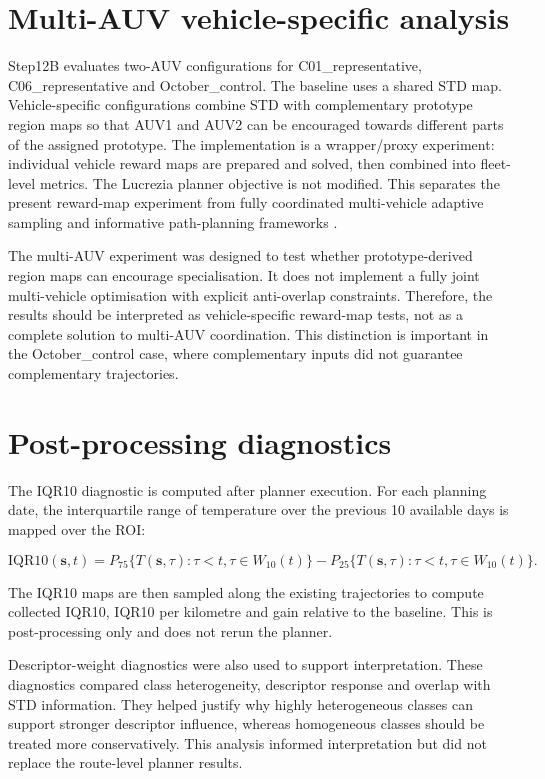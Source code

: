 \section{Multi-AUV vehicle-specific analysis}

Step12B evaluates two-AUV configurations for C01\_representative, C06\_representative and October\_control. The baseline uses a shared STD map. Vehicle-specific configurations combine STD with complementary prototype region maps so that AUV1 and AUV2 can be encouraged towards different parts of the assigned prototype. The implementation is a wrapper/proxy experiment: individual vehicle reward maps are prepared and solved, then combined into fleet-level metrics. The Lucrezia planner objective is not modified. This separates the present reward-map experiment from fully coordinated multi-vehicle adaptive sampling and informative path-planning frameworks \parencite{fiorelli2006multiauv,leonard2010gliderfleet,cao2013multirobotipp}.

The multi-AUV experiment was designed to test whether prototype-derived region maps can encourage specialisation. It does not implement a fully joint multi-vehicle optimisation with explicit anti-overlap constraints. Therefore, the results should be interpreted as vehicle-specific reward-map tests, not as a complete solution to multi-AUV coordination. This distinction is important in the October\_control case, where complementary inputs did not guarantee complementary trajectories.

\section{Post-processing diagnostics}

The IQR10 diagnostic is computed after planner execution. For each planning date, the interquartile range of temperature over the previous 10 available days is mapped over the ROI:

\begin{equation}
\mathrm{IQR10}(\mathbf{s},t)
=
P_{75}\{T(\mathbf{s},\tau):\tau<t,\tau\in W_{10}(t)\}
-
P_{25}\{T(\mathbf{s},\tau):\tau<t,\tau\in W_{10}(t)\}.
\label{eq:iqr10_definition}
\end{equation}

The IQR10 maps are then sampled along the existing trajectories to compute collected IQR10, IQR10 per kilometre and gain relative to the baseline. This is post-processing only and does not rerun the planner.

Descriptor-weight diagnostics were also used to support interpretation. These diagnostics compared class heterogeneity, descriptor response and overlap with STD information. They helped justify why highly heterogeneous classes can support stronger descriptor influence, whereas homogeneous classes should be treated more conservatively. This analysis informed interpretation but did not replace the route-level planner results.

